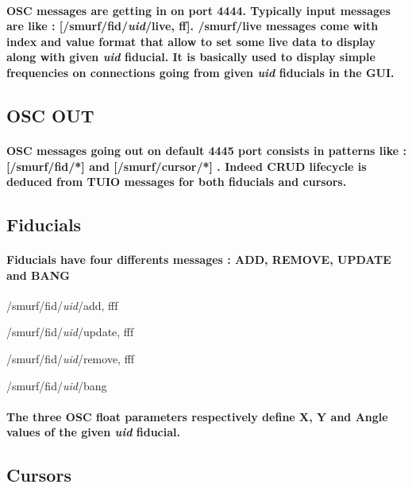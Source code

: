 \documentclass[10pt,a4paper]{book}
\begin{document}
\paragraph{OSC messages are getting in on port 4444. Typically input messages are like : [/smurf/fid/\textit{uid}/live, ff]. /smurf/live messages come with index and value format that allow to set some live data to display along with given \textit{uid} fiducial. It is basically used to display simple frequencies on connections going from given \textit{uid} fiducials in the GUI.}

\subsection{OSC OUT}

\paragraph{OSC messages going out on default 4445 port consists in patterns like : [/smurf/fid/*] and [/smurf/cursor/*] . Indeed CRUD lifecycle is deduced from TUIO messages for both fiducials and cursors.}

\subsection{Fiducials}

\paragraph{Fiducials have four differents messages : ADD, REMOVE, UPDATE and BANG}

\begin{list}{OSC:}{}
\item /smurf/fid/\textit{uid}/add, fff
\item /smurf/fid/\textit{uid}/update, fff
\item /smurf/fid/\textit{uid}/remove, fff
\item /smurf/fid/\textit{uid}/bang
\end{list}

\paragraph{The three OSC float parameters respectively define X, Y and Angle values of the given \textit{uid} fiducial. }


\subsection{Cursors}
\end{document}
